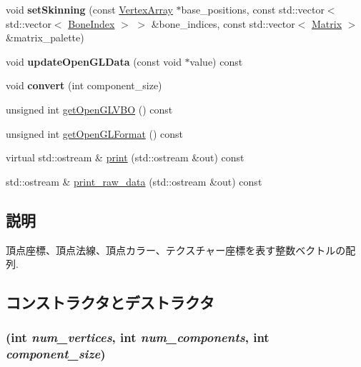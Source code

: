 \begin{CompactItemize}
\item 
\hypertarget{classm3g_1_1VertexArray_fcfcc1258ce0be7d0322d2e00809e1ea}{
void \textbf{setSkinning} (const \hyperlink{classm3g_1_1VertexArray}{VertexArray} $\ast$base\_\-positions, const std::vector$<$ std::vector$<$ \hyperlink{structm3g_1_1BoneIndex}{BoneIndex} $>$ $>$ \&bone\_\-indices, const std::vector$<$ \hyperlink{classm3g_1_1Matrix}{Matrix} $>$ \&matrix\_\-palette)}
\label{classm3g_1_1VertexArray_fcfcc1258ce0be7d0322d2e00809e1ea}

\item 
\hypertarget{classm3g_1_1VertexArray_f5518d17b77d25b05dc0b943b30a2fc0}{
void \textbf{updateOpenGLData} (const void $\ast$value) const }
\label{classm3g_1_1VertexArray_f5518d17b77d25b05dc0b943b30a2fc0}

\item 
\hypertarget{classm3g_1_1VertexArray_5c2359d08265a9f8605316789c40ece4}{
void \textbf{convert} (int component\_\-size)}
\label{classm3g_1_1VertexArray_5c2359d08265a9f8605316789c40ece4}

\item 
unsigned int \hyperlink{classm3g_1_1VertexArray_720ecee697dbf11d5f90dc998817b39d}{getOpenGLVBO} () const 
\item 
unsigned int \hyperlink{classm3g_1_1VertexArray_3e28ae5596cde78a980de02005a136f2}{getOpenGLFormat} () const 
\item 
virtual std::ostream \& \hyperlink{classm3g_1_1VertexArray_6fea17fa1532df3794f8cb39cb4f911f}{print} (std::ostream \&out) const 
\item 
std::ostream \& \hyperlink{classm3g_1_1VertexArray_85d61f1cdd10b3b5126cdb20291ae276}{print\_\-raw\_\-data} (std::ostream \&out) const 
\end{CompactItemize}


\subsection{説明}
頂点座標、頂点法線、頂点カラー、テクスチャー座標を表す整数ベクトルの配列. 

\subsection{コンストラクタとデストラクタ}
\hypertarget{classm3g_1_1VertexArray_5f38e30d23b5dc34b223e749e8afd0d0}{
\subsubsection[{VertexArray}]{ (int {\em num\_\-vertices}, \/  int {\em num\_\-components}, \/  int {\em component\_\-size})}}
\label{classm3g_1_1VertexArray_5f38e30d23b5dc34b223e749e8afd0d0}


